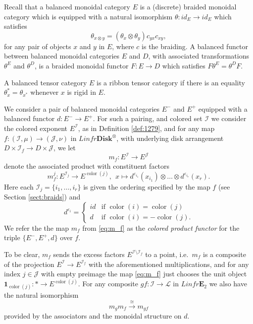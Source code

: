 \documentclass[reqno]{amsart}
\theoremstyle{definition}
\newcommand{\mcl}[1]{\mathcal{#1}}
\newcommand{\opn}[1]{\operatorname{#1}}
\newcommand{\ot}{\otimes}
\newcommand{\E}{\mathbf{E}}
\newcommand{\Disk}{\mathbf{Disk}}
\renewcommand{\1}{\mathbf{1}}
\begin{document}
Recall that a balanced monoidal category $E$ is a (discrete) braided monoidal category which is equipped with a natural isomorphism $\theta:id_E\to id_E$ which satisfies
\[
\theta_{x\ot y}=(\theta_x\ot \theta_y)c_{yx}c_{xy},
\]
for any pair of objects $x$ and $y$ in $E$, where $c$ is the braiding. A balanced functor between balanced monoidal categories $E$ and $D$, with associated transformations $\theta^E$ and $\theta^D$, is a braided monoidal functor $F:E\to D$ which satisfies $F\theta^E=\theta^DF$.

A balanced tensor category $E$ is a ribbon tensor category if there is an equality $\theta_x^{\ast}=\theta_{x^{\ast}}$ whenever $x$ is rigid in $E$.

We consider a pair of balanced monoidal categories $E^-$ and $E^+$ equipped with a balanced functor $d:E^-\to E^+$.  For such a pairing, and colored set $\mcl{I}$ we consider the colored exponent $E^{\mcl{I}}$, as in Definition \ref{def:1279}, and for any map $f:(\mcl{I},\mu)\to (\mcl{J},\nu)$ in $Linfr\Disk^{\ot}$, with underlying disk arrangement $D\times \mcl{I}_f\to D\times \mcl{J}$, we let
\begin{equation}\label{eq:m_f}
m_f:E^{\mcl{I}}\to E^{\mcl{J}}
\end{equation}
denote the associated product with constituent factors
\[
m_f^j:E^{\mcl{I}_j}\to E^{\opn{color}(j)},\ \ x\mapsto d^{\varepsilon_{i_1}}(x_{i_1})\ot\dots\ot d^{\varepsilon_{i_r}}(x_r).
\]
Here each $\mcl{I}_j=\{i_1,\dots, i_r\}$ is given the ordering specified by the map $f$ (see Section \ref{sect:braids}) and
\[
d^{\varepsilon_i}=\left\{
\begin{array}{ll}
id & \text{if }\opn{color}(i)=\opn{color}(j)\\
d & \text{if }\opn{color}(i)=-\opn{color}(j).
\end{array}\right.
\]
We refer the the map $m_f$ from \eqref{eq:m_f} as the \emph{colored product functor} for the triple $\{E^-,E^+,d\}$ over $f$.
\par

To be clear, $m_f$ sends the excess factors $E^{\mcl{I}\setminus \mcl{I}_{f}}$ to a point, i.e.\ $m_f$ is a composite of the projection $E^{\mcl{I}}\to E^{\mcl{I}_{f}}$ with the aforementioned multiplications, and for any index $j\in \mcl{J}$ with empty preimage the map \eqref{eq:m_f} just chooses the unit object $\1_{\opn{color}(j)}:\ast\to E^{\opn{color}(j)}$. For any composite $gf:\mcl{I}\to \mcl{L}$ in $Linfr\E_2$ we also have the natural isomorphism
\[
m_gm_f\overset{\cong}\to m_{gf}
\]
provided by the associators and the monoidal structure on $d$.
\end{document}
